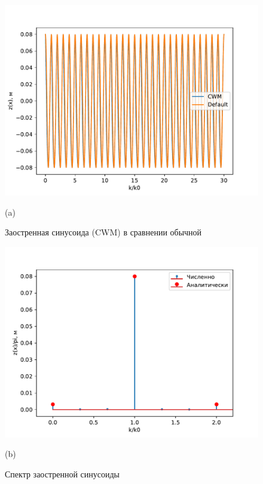 \begin{figure}[ht]
    \begin{minipage}{0.49\linewidth}
        \centering
        \includegraphics[width=\linewidth]{fig/cwm_surface.pdf}

        (a)
        \caption{Заостренная синусоида (CWM) в сравнении обычной}
        \label{fig:1}
    \end{minipage}
    \hfill
    \begin{minipage}{0.49\linewidth}
        \centering
        \includegraphics[width=\linewidth]{fig/cwm_spectrum.pdf}

        (b)
        \caption{Спектр заостренной синусоиды}
        \label{fig:2}
    \end{minipage}
\end{figure}
 
